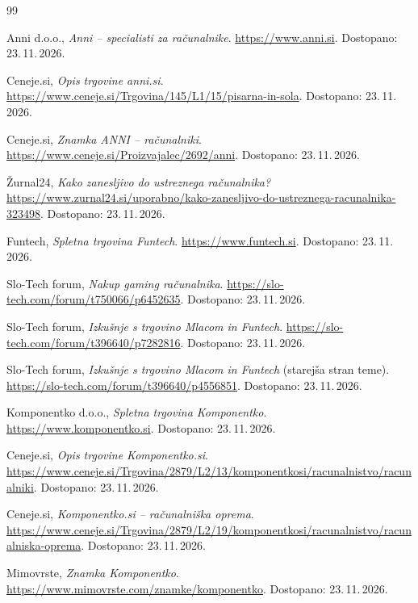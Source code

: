 \documentclass[11pt,a4paper]{article}
\begin{document}
\begin{thebibliography}{99}

Anni d.o.o., \textit{Anni -- specialisti za računalnike}.
\url{https://www.anni.si}. Dostopano: 23.\,11.\,2026.

Ceneje.si, \textit{Opis trgovine anni.si}.
\url{https://www.ceneje.si/Trgovina/145/L1/15/pisarna-in-sola}. Dostopano: 23.\,11.\,2026.

Ceneje.si, \textit{Znamka ANNI -- računalniki}.
\url{https://www.ceneje.si/Proizvajalec/2692/anni}. Dostopano: 23.\,11.\,2026.

Žurnal24, \textit{Kako zanesljivo do ustreznega računalnika?}
\url{https://www.zurnal24.si/uporabno/kako-zanesljivo-do-ustreznega-racunalnika-323498}.
Dostopano: 23.\,11.\,2026.

Funtech, \textit{Spletna trgovina Funtech}.
\url{https://www.funtech.si}. Dostopano: 23.\,11.\,2026.

Slo-Tech forum, \textit{Nakup gaming računalnika}.
\url{https://slo-tech.com/forum/t750066/p6452635}. Dostopano: 23.\,11.\,2026.

Slo-Tech forum, \textit{Izkušnje s trgovino Mlacom in Funtech}.
\url{https://slo-tech.com/forum/t396640/p7282816}. Dostopano: 23.\,11.\,2026.

Slo-Tech forum, \textit{Izkušnje s trgovino Mlacom in Funtech} (starejša stran teme).
\url{https://slo-tech.com/forum/t396640/p4556851}. Dostopano: 23.\,11.\,2026.

Komponentko d.o.o., \textit{Spletna trgovina Komponentko}.
\url{https://www.komponentko.si}. Dostopano: 23.\,11.\,2026.

Ceneje.si, \textit{Opis trgovine Komponentko.si}.
\url{https://www.ceneje.si/Trgovina/2879/L2/13/komponentkosi/racunalnistvo/racunalniki}.
Dostopano: 23.\,11.\,2026.

Ceneje.si, \textit{Komponentko.si -- računalniška oprema}.
\url{https://www.ceneje.si/Trgovina/2879/L2/19/komponentkosi/racunalnistvo/racunalniska-oprema}.
Dostopano: 23.\,11.\,2026.

Mimovrste, \textit{Znamka Komponentko}.
\url{https://www.mimovrste.com/znamke/komponentko}. Dostopano: 23.\,11.\,2026.

\end{thebibliography}
\end{document}
